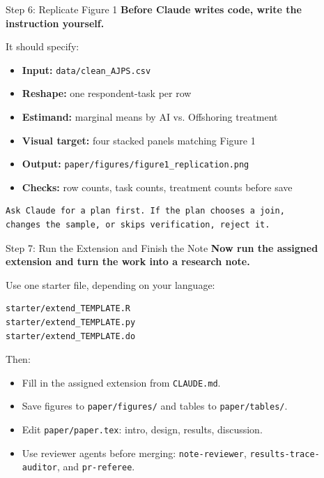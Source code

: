 \documentclass[aspectratio=169, 11pt]{beamer}
\begin{document}
\begin{frame}[fragile]{Step 6: Replicate Figure 1}
  \textbf{Before Claude writes code, write the instruction yourself.}

  \vspace{0.4em}
  It should specify:
  \begin{itemize}\small
    \item \textbf{Input:} \texttt{data/clean\_AJPS.csv}
    \item \textbf{Reshape:} one respondent-task per row
    \item \textbf{Estimand:} marginal means by AI vs. Offshoring treatment
    \item \textbf{Visual target:} four stacked panels matching Figure 1
    \item \textbf{Output:} \texttt{paper/figures/figure1\_replication.png}
    \item \textbf{Checks:} row counts, task counts, treatment counts before save
  \end{itemize}

  \vspace{0.4em}
  \begin{lstlisting}[basicstyle=\ttfamily\scriptsize]
Ask Claude for a plan first. If the plan chooses a join,
changes the sample, or skips verification, reject it.
  \end{lstlisting}
\end{frame}

\begin{frame}[fragile]{Step 7: Run the Extension and Finish the Note}
  \textbf{Now run the assigned extension and turn the work into a research note.}

  \vspace{0.4em}
  Use one starter file, depending on your language:
  \begin{lstlisting}[basicstyle=\ttfamily\scriptsize]
starter/extend_TEMPLATE.R
starter/extend_TEMPLATE.py
starter/extend_TEMPLATE.do
  \end{lstlisting}

  \vspace{0.3em}
  Then:
  \begin{itemize}\small
    \item Fill in the assigned extension from \texttt{CLAUDE.md}.
    \item Save figures to \texttt{paper/figures/} and tables to \texttt{paper/tables/}.
    \item Edit \texttt{paper/paper.tex}: intro, design, results, discussion.
    \item Use reviewer agents before merging: \texttt{note-reviewer}, \texttt{results-trace-auditor}, and \texttt{pr-referee}.
  \end{itemize}
\end{frame}
\end{document}
